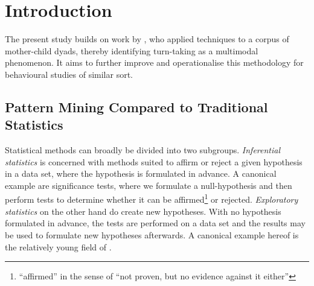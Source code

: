 


\chapter{Introduction}
The present study builds on work by , who applied \fpm{} techniques to a corpus of mother-child dyads, thereby identifying turn-taking as a multimodal phenomenon. It aims to further improve and operationalise this methodology for behavioural studies of similar sort.

\section{Pattern Mining Compared to Traditional Statistics}
Statistical methods can broadly be divided into two subgroups. \emph{Inferential statistics} is concerned with methods suited to affirm or reject a given hypothesis in a data set, where the hypothesis is formulated in advance. A canonical example are significance tests, where we formulate a null-hypothesis and then perform tests to determine whether it can be affirmed\footnote{``affirmed'' in the sense of ``not proven, but no evidence against it either''}
or rejected. \emph{Exploratory statistics} on the other hand do create new hypotheses. With no hypothesis formulated in advance, the tests are performed on a data set and the results may be used to formulate new hypotheses afterwards. A canonical example hereof is the relatively young field of \fpm.


